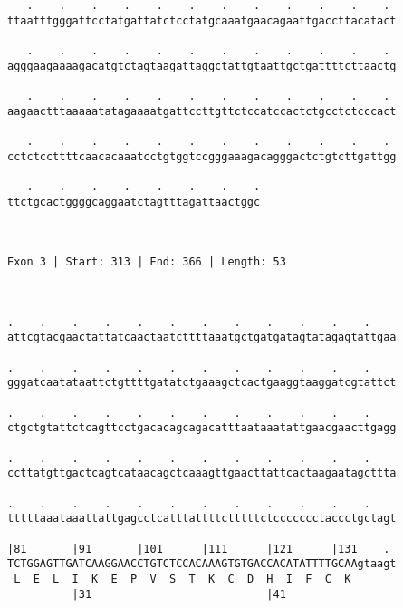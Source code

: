 \documentclass{article}
\begin{document}
\begin{Verbatim}
   .    .    .    .    .    .    .    .    .    .    .    . 
ttaatttgggattcctatgattatctcctatgcaaatgaacagaattgaccttacatact
                                                            
   .    .    .    .    .    .    .    .    .    .    .    . 
agggaagaaaagacatgtctagtaagattaggctattgtaattgctgattttcttaactg
                                                            
   .    .    .    .    .    .    .    .    .    .    .    . 
aagaactttaaaaatatagaaaatgattccttgttctccatccactctgcctctcccact
                                                            
   .    .    .    .    .    .    .    .    .    .    .    . 
cctctccttttcaacacaaatcctgtggtccgggaaagacagggactctgtcttgattgg
                                                            
   .    .    .    .    .    .    .    .
ttctgcactggggcaggaatctagtttagattaactggc
                                       
                                       
 
Exon 3 | Start: 313 | End: 366 | Length: 53



.    .    .    .    .    .    .    .    .    .    .    .    
attcgtacgaactattatcaactaatcttttaaatgctgatgatagtatagagtattgaa
                                                            
.    .    .    .    .    .    .    .    .    .    .    .    
gggatcaatataattctgttttgatatctgaaagctcactgaaggtaaggatcgtattct
                                                            
.    .    .    .    .    .    .    .    .    .    .    .    
ctgctgtattctcagttcctgacacagcagacatttaataaatattgaacgaacttgagg
                                                            
.    .    .    .    .    .    .    .    .    .    .    .    
ccttatgttgactcagtcataacagctcaaagttgaacttattcactaagaatagcttta
                                                            
.    .    .    .    .    .    .    .    .    .    .    .    
tttttaaataaattattgagcctcatttattttctttttctccccccctaccctgctagt
                                                            
|81       |91       |101      |111      |121      |131    . 
TCTGGAGTTGATCAAGGAACCTGTCTCCACAAAGTGTGACCACATATTTTGCAAgtaagt
 L  E  L  I  K  E  P  V  S  T  K  C  D  H  I  F  C  K       
          |31                           |41                 
  

\end{Verbatim}
\end{document}
